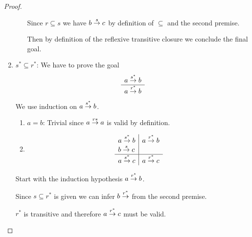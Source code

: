 \begin{theorem}
\begin{proof}
\begin{enumerate}
\begin{enumerate}
                        Since $r \subseteq s$ we have $b \stackrel{s}{\to} c$ by
                        definition of $\subseteq$ and the second premise.

                        Then by definition of the reflexive transitive closure
                        we conclude the final goal.
                \end{enumerate}

            \item $s^* \subseteq r^*$: We have to prove the goal
                $$
                \begin{array}{c} a \stackrel{s^*}{\to} b \\ \hline a \stackrel{r^*}{\to} b\end{array}
                $$
                We use induction on $a \stackrel{s^*}{\to} b$.
                \begin{enumerate}
                    \item $a = b$: Trivial since $a \stackrel{r*}{\to} a$ is valid by
                        definition.

                    \item
                        $$
                        \begin{array}{l|l}
                            a \stackrel{s^*}{\to} b
                            &
                            a \stackrel{r^*}{\to} b
                            \\
                            b \stackrel{s}{\to} c
                            \\
                            \hline
                            a \stackrel{s^*}{\to} c
                            &
                            a \stackrel{r^*}{\to} c
                        \end{array}
                        $$
                \end{enumerate}

                Start with the induction hypothesis $a \stackrel{r^*}{\to} b$.

                Since $s \subseteq r^*$ is given we can infer $b \stackrel{r^*}{\to}$
                from the second premise.

                $r^*$ is transitive and therefore $a \stackrel{r^*}{\to} c$ must be
                valid.
        \end{enumerate}
    \end{proof}
\end{theorem}




